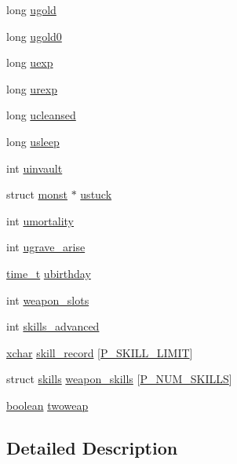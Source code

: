 \begin{DoxyCompactItemize}
long \hyperlink{structyou_af666e1fd44c5efe34df9053aef068245}{ugold}
\item 
long \hyperlink{structyou_a2f0d94fc447b721c2f289fcc201cab38}{ugold0}
\item 
long \hyperlink{structyou_a3a113c432a2a47b28f746f9455907487}{uexp}
\item 
long \hyperlink{structyou_ac096bd7eef66e6d79962d6e9848071df}{urexp}
\item 
long \hyperlink{structyou_a1f1b1b1396768943e6d28f1bb7f92181}{ucleansed}
\item 
long \hyperlink{structyou_a66ad1d014c330de174c200ca40b701d5}{usleep}
\item 
int \hyperlink{structyou_a3ec671b2cb8346e23eea84a63336597c}{uinvault}
\item 
struct \hyperlink{structmonst}{monst} $\ast$ \hyperlink{structyou_a774d4dad2da130ec9ed1d2e6c5e0fa80}{ustuck}
\item 
int \hyperlink{structyou_a2d62ea3354111911f4afc839b0d8621b}{umortality}
\item 
int \hyperlink{structyou_af66a5ecd2d2a4f3443af9cc10fb928f3}{ugrave\+\_\+arise}
\item 
\hyperlink{wceconf_8h_ae314912f2d5fb5362d86efe017e755f4}{time\+\_\+t} \hyperlink{structyou_a45b76395357b04e8d437260eb1d5f9f3}{ubirthday}
\item 
int \hyperlink{structyou_af33d1854333dc6d8156b1b92a49742e0}{weapon\+\_\+slots}
\item 
int \hyperlink{structyou_a13f09328a1c11c4a1bee0309d0ef84e6}{skills\+\_\+advanced}
\item 
\hyperlink{global_8h_a2043b7d01ce89f4ee2fa6c345a752d32}{xchar} \hyperlink{structyou_ae1a263e0ff3b5780cfec4a4270de467d}{skill\+\_\+record} \mbox{[}\hyperlink{skills_8h_a73d53cec81bc1d01b59bb17bff7d232d}{P\+\_\+\+S\+K\+I\+L\+L\+\_\+\+L\+I\+M\+I\+T}\mbox{]}
\item 
struct \hyperlink{structskills}{skills} \hyperlink{structyou_a15a56de7ee4ff4f8166b119ee2c92d98}{weapon\+\_\+skills} \mbox{[}\hyperlink{skills_8h_ac0e6e27c496425d0222708abd0fbf591}{P\+\_\+\+N\+U\+M\+\_\+\+S\+K\+I\+L\+L\+S}\mbox{]}
\item 
\hyperlink{global_8h_a531b10dd351aa162d7dcccd1966308b8}{boolean} \hyperlink{structyou_ade2cee6956bba775aa796bba6ae857ec}{twoweap}
\end{DoxyCompactItemize}


\subsection{Detailed Description}


